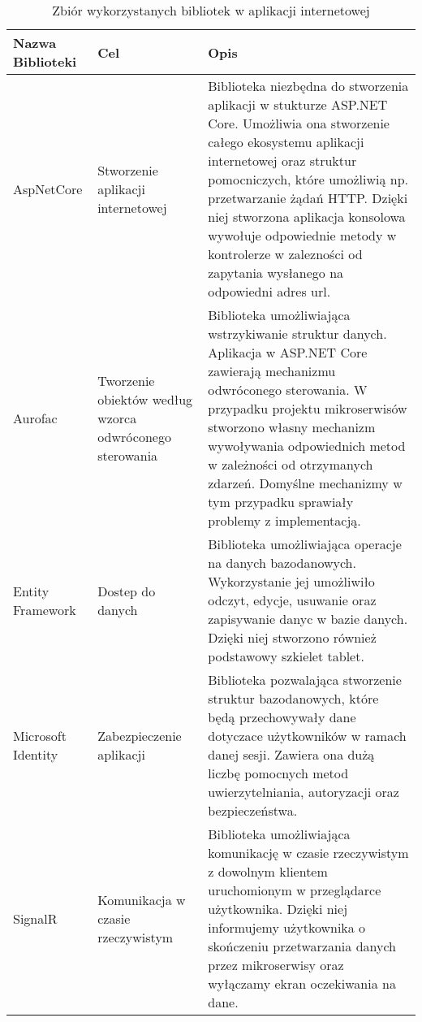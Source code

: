 \begin{center}
    \begin{longtable}{ | p{3.1cm} | p{4cm} | p{6.5cm} |}
   	\caption{Zbiór wykorzystanych bibliotek w aplikacji internetowej}
   	\label{librariesDotNet} \\
    \hline Nazwa \newline Biblioteki & Cel & Opis \\ \hline    
    
    \hline AspNetCore &
   			 Stworzenie aplikacji internetowej
   		
    & Biblioteka niezbędna do stworzenia aplikacji w stukturze ASP.NET Core. Umożliwia ona stworzenie całego ekosystemu aplikacji internetowej oraz struktur pomocniczych, które umożliwią np. przetwarzanie żądań HTTP. Dzięki niej stworzona aplikacja konsolowa wywołuje odpowiednie metody w kontrolerze w zalezności od zapytania wysłanego na odpowiedni adres url.\\ \hline
    
    \hline 
    Aurofac 
    & Tworzenie obiektów według wzorca odwróconego sterowania
    & Biblioteka umożliwiająca wstrzykiwanie struktur danych. Aplikacja w ASP.NET Core zawierają mechanizmu odwróconego sterowania. W przypadku projektu mikroserwisów stworzono własny mechanizm wywoływania odpowiednich metod w zależności od otrzymanych zdarzeń. Domyślne mechanizmy w tym przypadku sprawiały problemy z implementacją.\\ \hline
    
    \hline Entity \newline Framework
    & Dostep do danych
    &  Biblioteka umożliwiająca operacje na danych bazodanowych. Wykorzystanie jej umożliwiło odczyt, edycje, usuwanie oraz zapisywanie danyc w bazie danych. Dzięki niej stworzono również podstawowy szkielet tablet.
    \\ \hline
    
    \hline Microsoft \newline Identity 
    & Zabezpieczenie \newline aplikacji
   	& Biblioteka pozwalająca stworzenie struktur bazodanowych, które będą przechowywały dane dotyczace użytkowników w ramach danej sesji. Zawiera ona dużą liczbę pomocnych metod uwierzytelniania, autoryzacji oraz bezpieczeństwa. \\ \hline
    
    \hline SignalR 
    & Komunikacja w czasie rzeczywistym
    & Biblioteka umożliwiająca komunikację w czasie rzeczywistym z dowolnym klientem uruchomionym w przeglądarce użytkownika. Dzięki niej informujemy użytkownika o skończeniu przetwarzania danych przez mikroserwisy oraz wyłączamy ekran oczekiwania na dane.\\ \hline
    

\end{longtable}
\end{center}
